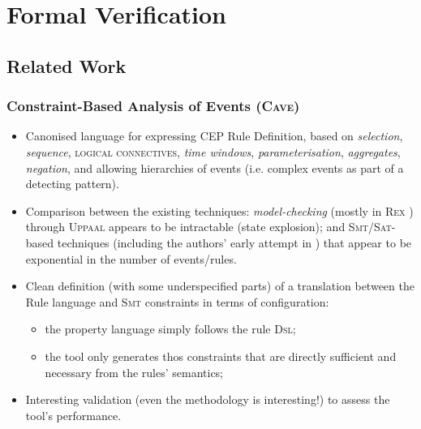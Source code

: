 \chapter{Formal Verification}
\label{sec:FV}

\section{Related Work}
\label{sec:FV-RW}

\subsection{Constraint-Based Analysis of Events (\textsc{Cave}) \cite{Cugola-Margara-Pezze-Pradella:2015}}
\label{FV-RW-CAVE}

\begin{itemize}
	\item Canonised language for expressing CEP Rule Definition, based on \emph{selection}, \emph{sequence}, \textsc{logical connectives}, \emph{time windows}, \emph{parameterisation}, \emph{aggregates}, \emph{negation}, and allowing hierarchies of events (i.e. complex events as part of a detecting pattern).
	
	\item Comparison between the existing techniques: \emph{model-checking} (mostly in \textsc{Rex} \cite{Ericsson-Berndtsson:2007,Ericsson-Pettersson-Berndtsson-Seirio:2007}) through \textsc{Uppaal} appears to be intractable (state explosion); and \textsc{Smt/Sat}-based techniques (including the authors' early attempt in \cite{Cugola-Margara:2010}) that appear to be exponential in the number of events/rules.
	
	\item Clean definition (with some underspecified parts) of a translation between the Rule language and \textsc{Smt} constraints in terms of configuration: 
	\begin{itemize}
		\item the property language simply follows the rule \textsc{Dsl};
		\item the tool only generates thos constraints that are directly sufficient and necessary from the rules' semantics;
	\end{itemize}
	
	\item Interesting validation (even the methodology is interesting!) to assess the tool's performance.
\end{itemize}


